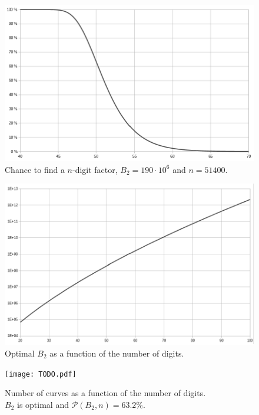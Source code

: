 \documentclass[a4paper, 11pt, pdftex]{report}
\theoremstyle{plain}
\theoremstyle{definition}
\begin{document}
\begin{figure}[!h]
	\centering
	\includegraphics[width=14cm, angle=0]{prob_digits.pdf}
	\caption{\label{fig:B2_dgt} Chance to find a $n$-digit factor, $B_2 = 190\cdot 10^6$ and $n = 51400$.}
\end{figure}

\begin{figure}[!h]
	\centering
	\includegraphics[width=14cm, angle=0]{B2_digits.pdf}
	\caption{\label{fig:B2_dgt} Optimal $B_2$ as a function of the number of digits.}
\end{figure}

\begin{figure}[!h]
	\captionsetup{format=hang, justification=centering}
	\centering
	\texttt{[image: TODO.pdf]}
	\caption{\label{fig:B2_dgt} Number of curves as a function of the number of digits.\\
	$B_2$ is optimal and $\mathcal{P}(B_2, n) = 63.2\%$.}
\end{figure}
\end{document}
